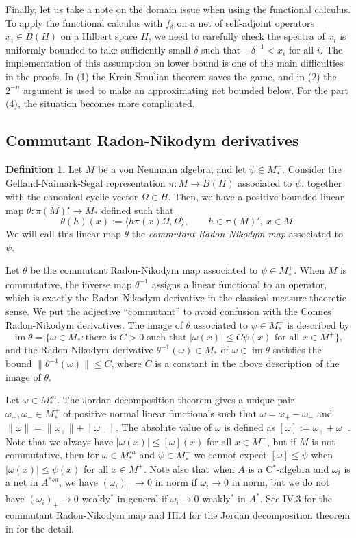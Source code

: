 \documentclass[noamsfonts,a4paper,10pt]{amsart}
\theoremstyle{plain}
\theoremstyle{definition}
\newtheorem{defn}[thm]{Definition}
\theoremstyle{remark}
\begin{document}
Finally, let us take a note on the domain issue when using the functional calculus.
To apply the functional calculus with $f_\delta$ on a net of self-adjoint operators $x_i\in B(H)$ on a Hilbert space $H$, we need to carefully check the spectra of $x_i$ is uniformly bounded to take sufficiently small $\delta$ such that $-\delta^{-1}<x_i$ for all $i$.
The implementation of this assumption on lower bound is one of the main difficulties in the proofs.
In (1) the Krein-\v Smulian theorem saves the game, and in (2) the $2^{-n}$ argument is used to make an approximating net bounded below.
For the part (4), the situation becomes more complicated.



\subsection{Commutant Radon-Nikodym derivatives}

\begin{defn}
Let $M$ be a von Neumann algebra, and let $\psi\in M_*^+$.
Consider the Gelfand-Naimark-Segal representation $\pi:M\to B(H)$ associated to $\psi$, together with the canonical cyclic vector $\Omega\in H$.
Then, we have a positive bounded linear map $\theta:\pi(M)'\to M_*$ defined such that
\[\theta(h)(x):=\langle h\pi(x)\Omega,\Omega\rangle,\qquad h\in\pi(M)',\ x\in M.\]
We will call this linear map $\theta$ the \emph{commutant Radon-Nikodym map} associated to $\psi$.
\end{defn}
Let $\theta$ be the commutant Radon-Nikodym map associated to $\psi\in M_*^+$.
When $M$ is commutative, the inverse map $\theta^{-1}$ assigns a linear functional to an operator, which is exactly the Radon-Nikodym derivative in the classical measure-theoretic sense.
We put the adjective ``commutant'' to avoid confusion with the Connes Radon-Nikodym derivatives.
The image of $\theta$ associated to $\psi\in M_*^+$ is described by
\[\operatorname{im}\theta=\{\omega\in M_*:\text{there is $C>0$ such that $|\omega(x)|\le C\psi(x)$ for all $x\in M^+$}\},\]
and the Radon-Nikodym derivative $\theta^{-1}(\omega)\in M_*$ of $\omega\in\operatorname{im}\theta$ satisfies the bound $\|\theta^{-1}(\omega)\|\le C$, where $C$ is a constant in the above description of the image of $\theta$.

Let $\omega\in M_*^{sa}$.
The Jordan decomposition theorem gives a unique pair $\omega_+,\omega_-\in M_*^+$ of positive normal linear functionals such that $\omega=\omega_+-\omega_-$ and $\|\omega\|=\|\omega_+\|+\|\omega_-\|$.
The absolute value of $\omega$ is defined as $[\omega]:=\omega_++\omega_-$.
Note that we always have $|\omega(x)|\le[\omega](x)$ for all $x\in M^+$, but if $M$ is not commutative, then for $\omega\in M_*^{sa}$ and $\psi\in M_*^+$ we cannot expect $[\omega]\le\psi$ when $|\omega(x)|\le\psi(x)$ for all $x\in M^+$.
Note also that when $A$ is a C$^*$-algebra and $\omega_i$ is a net in $A^{*sa}$, we have $(\omega_i)_+\to0$ in norm if $\omega_i\to0$ in norm, but we do not have $(\omega_i)_+\to0$ weakly$^*$ in general if $\omega_i\to0$ weakly$^*$ in $A^*$. 
See IV.3 for the commutant Radon-Nikodym map and III.4 for the Jordan decomposition theorem in \cite{MR1873025} for the detail.
\end{document}
